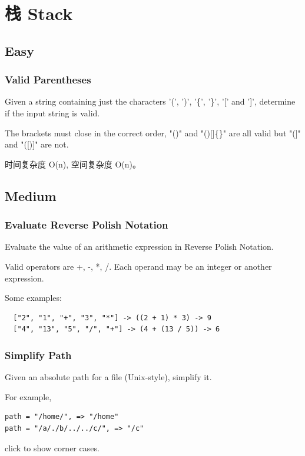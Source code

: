 \documentclass[12pt]{book}
\begin{document}
\chapter{栈 Stack}
\label{sec-5}
\section{Easy}
\label{sec-5-1}
\subsection{Valid Parentheses}
\label{sec-5-1-1}
Given a string containing just the characters '(', ')', '\{', '\}', '[' and ']', determine if the input string is valid.

The brackets must close in the correct order, "()" and "()[]\{\}" are all valid but "(]" and "([)]" are not.

时间复杂度 O(n), 空间复杂度 O(n)。

\section{Medium}
\label{sec-5-2}
\subsection{Evaluate Reverse Polish Notation}
\label{sec-5-2-1}
Evaluate the value of an arithmetic expression in Reverse Polish Notation.

Valid operators are +, -, *, /. Each operand may be an integer or another expression.

Some examples:
\lstset{language=java,label= ,caption= ,numbers=none}
\begin{lstlisting}
  ["2", "1", "+", "3", "*"] -> ((2 + 1) * 3) -> 9
  ["4", "13", "5", "/", "+"] -> (4 + (13 / 5)) -> 6
\end{lstlisting}

\subsection{Simplify Path}
\label{sec-5-2-2}
Given an absolute path for a file (Unix-style), simplify it.

For example,
\lstset{language=java,label= ,caption= ,numbers=none}
\begin{lstlisting}
path = "/home/", => "/home"
path = "/a/./b/../../c/", => "/c"
\end{lstlisting}

click to show corner cases.
\end{document}
